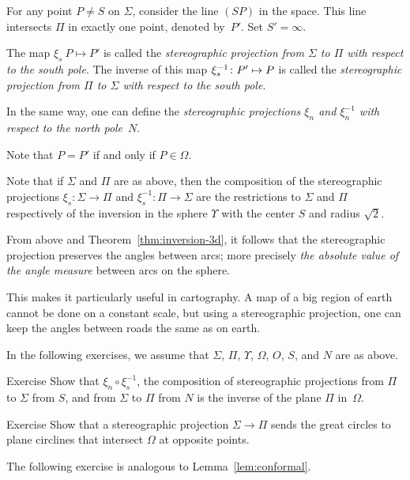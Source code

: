 For any point $P\ne S$ on $\Sigma$,
consider the line $(SP)$ in the space. 
This line intersects $\Pi$ in exactly one point, denoted by~$P'$. 
Set $S'=\infty$.


The map $\xi_s\: P\mapsto P'$ is called the \emph{stereographic projection from $\Sigma$ to $\Pi$ with respect to the south pole}.
The inverse of this map $\xi^{-1}_s\: P'\z\mapsto P$ is called the {}\emph{stereographic projection from $\Pi$ to $\Sigma$ with respect to the south pole}.

In the same way, one can define the
{}\emph{stereographic projections $\xi_n$ and $\xi^{-1}_n$ with respect to the north pole}~$N$.

Note that $P=P'$ if and only if $P\in\Omega$.


Note that if $\Sigma$ and $\Pi$ are as above,
then the composition of the stereographic projections 
$\xi_s: \Sigma\to\Pi$ and  $\xi^{-1}_s: \Pi\to\Sigma$
are the restrictions to $\Sigma$ and $\Pi$ respectively of the inversion in the sphere $\Upsilon$ with the center $S$ and radius $\sqrt{2}$.


From above and Theorem~\ref{thm:inversion-3d},
it follows that the stereographic projection preserves 
the angles between arcs;
more precisely {}\emph{the absolute value of the angle measure} between arcs on the sphere.

This makes it particularly useful in cartography.
A map of a big region of earth cannot be done on a constant scale,
but using a stereographic projection, one can keep the angles between roads the same as on earth.

In the following exercises,
we assume that $\Sigma$, $\Pi$, $\Upsilon$, $\Omega$, $O$, $S$, and $N$ are as above.
  
\begin{thm}{Exercise}\label{ex:two-stereographics}
Show that $\xi_n \circ \xi^{-1}_s$, the composition of stereographic projections 
from $\Pi$ to $\Sigma$ from  $S$, and
from $\Sigma$ to $\Pi$ from  $N$ is 
the inverse of the plane $\Pi$ in~$\Omega$.
\end{thm}

\begin{thm}{Exercise}\label{ex:great-circ}
Show that  a stereographic projection $\Sigma\to\Pi$
sends the great circles to plane circlines that intersect $\Omega$ at opposite points.
\end{thm}

The following exercise is analogous to Lemma~\ref{lem:conformal}.

